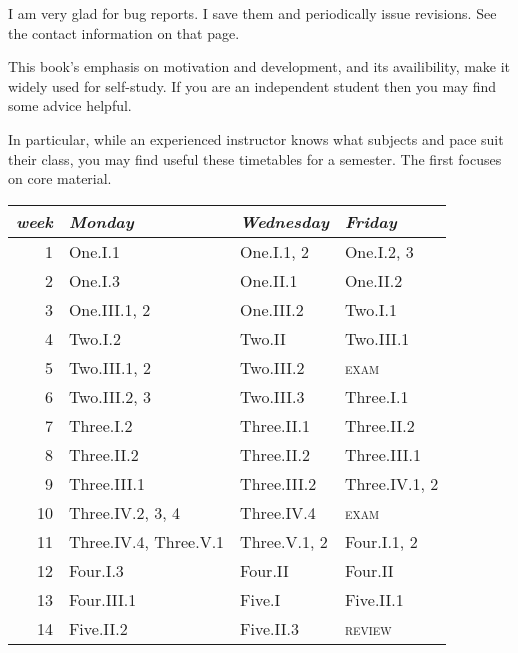 I am very glad for bug reports.
I save them and periodically issue revisions.
See the contact information on that page.


\newcommand{\classday}[1]{\textsc{#1}}
\newcommand{\colwidth}{1.25in}

\medskip
{}
%
This book's emphasis on motivation and development,
and its availibility, make it widely used for self-study.
If you are an independent student 
then you may find some advice helpful.

In particular, while an experienced instructor knows what subjects and
pace suit their class, you may find useful these
timetables for a semester.
The first focuses on core material.
\begin{center} \small
   \begin{tabular}{r|*{2}{p{\colwidth}}l}
      \textit{week}  
       &\textit{Monday}          
       &\textit{Wednesday}            
       &\textit{Friday}        \\ \hline
       1    &One.I.1         &One.I.1, 2        &One.I.2, 3         \\
       2    &One.I.3         &One.II.1          &One.II.2         \\
       3    &One.III.1, 2    &One.III.2         &Two.I.1         \\
       4    &Two.I.2         &Two.II            &Two.III.1         \\
       5    &Two.III.1, 2    &Two.III.2         &\classday{exam}          \\
       6    &Two.III.2, 3    &Two.III.3         &Three.I.1        \\
       7    &Three.I.2         &Three.II.1          &Three.II.2         \\
       8    &Three.II.2        &Three.II.2          &Three.III.1          \\
       9    &Three.III.1       &Three.III.2         &Three.IV.1, 2       \\
      10    &Three.IV.2, 3, 4  &Three.IV.4          &\classday{exam}          \\
      11    &Three.IV.4, Three.V.1 &Three.V.1, 2        &Four.I.1, 2         \\
      12    &Four.I.3         &Four.II            &Four.II       \\
      13    &Four.III.1       &Five.I             &Five.II.1         \\
      14    &Five.II.2        &Five.II.3          &\classday{review}        
   \end{tabular}
\end{center}
